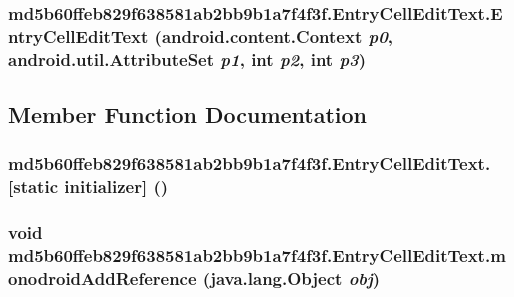 \hypertarget{classmd5b60ffeb829f638581ab2bb9b1a7f4f3f_1_1_entry_cell_edit_text_859aeac3b874f8ae9f62a0be2671d9da}{
\subsubsection[{EntryCellEditText}]{\setlength{\rightskip}{0pt plus 5cm}md5b60ffeb829f638581ab2bb9b1a7f4f3f.EntryCellEditText.EntryCellEditText (android.content.Context {\em p0}, \/  android.util.AttributeSet {\em p1}, \/  int {\em p2}, \/  int {\em p3})}}
\label{classmd5b60ffeb829f638581ab2bb9b1a7f4f3f_1_1_entry_cell_edit_text_859aeac3b874f8ae9f62a0be2671d9da}




\subsection{Member Function Documentation}
\hypertarget{classmd5b60ffeb829f638581ab2bb9b1a7f4f3f_1_1_entry_cell_edit_text_31875e94294c3cd7f286afc776f43bc7}{
\subsubsection[{[static initializer]}]{\setlength{\rightskip}{0pt plus 5cm}md5b60ffeb829f638581ab2bb9b1a7f4f3f.EntryCellEditText.\mbox{[}static initializer\mbox{]} ()}}
\label{classmd5b60ffeb829f638581ab2bb9b1a7f4f3f_1_1_entry_cell_edit_text_31875e94294c3cd7f286afc776f43bc7}


\hypertarget{classmd5b60ffeb829f638581ab2bb9b1a7f4f3f_1_1_entry_cell_edit_text_c2b60c2aace620dcf6c35e776cc89db4}{
\subsubsection[{monodroidAddReference}]{\setlength{\rightskip}{0pt plus 5cm}void md5b60ffeb829f638581ab2bb9b1a7f4f3f.EntryCellEditText.monodroidAddReference (java.lang.Object {\em obj})}}
\label{classmd5b60ffeb829f638581ab2bb9b1a7f4f3f_1_1_entry_cell_edit_text_c2b60c2aace620dcf6c35e776cc89db4}


